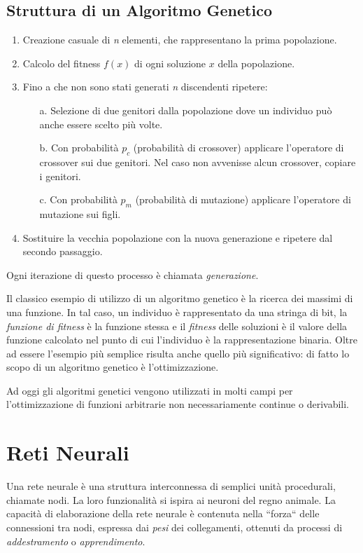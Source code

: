 \documentclass[12pt,a4paper]{report}
\begin{document}
\subsection{Struttura di un Algoritmo Genetico}

\begin{enumerate}
 \item Creazione casuale di \textit{n} elementi, che rappresentano la prima popolazione. 
 \item Calcolo del fitness $f(x)$ di ogni soluzione $x$ della popolazione.
 \item Fino a che non sono stati generati \textit{n} discendenti ripetere:
 \begin{enumerate}
  \item[a.] Selezione di due genitori dalla popolazione dove un individuo può anche essere scelto più volte.
  \item[b.] Con probabilità $p_{c}$ (probabilità di crossover) applicare l'operatore di crossover sui due genitori. Nel caso non avvenisse alcun crossover, copiare i genitori.
  \item[c.] Con probabilità $p_{m}$ (probabilità di mutazione) applicare l'operatore di mutazione sui figli.
 \end{enumerate}
 \item Sostituire la vecchia popolazione con la nuova generazione e ripetere dal secondo passaggio.
\end{enumerate}

Ogni iterazione di questo processo è chiamata \textit{generazione}.

Il classico esempio di utilizzo di un algoritmo genetico è la ricerca dei massimi di una funzione.
In tal caso, un individuo è rappresentato da una stringa di bit, la \textit{funzione di fitness} è la funzione stessa e il \textit{fitness} delle soluzioni è il valore della funzione calcolato nel punto di cui l'individuo è la rappresentazione binaria.
Oltre ad essere l'esempio più semplice risulta anche quello più significativo: di fatto lo scopo di un algoritmo genetico è l'ottimizzazione.  

Ad oggi gli algoritmi genetici vengono utilizzati in molti campi per l'ottimizzazione di funzioni arbitrarie non necessariamente continue o derivabili.

\section{Reti Neurali}

Una rete neurale è una struttura interconnessa di semplici unità procedurali, chiamate nodi. La loro funzionalità si ispira ai neuroni del regno animale. La capacità di elaborazione della rete neurale è contenuta nella ``forza`` delle connessioni tra nodi, espressa dai \textit{pesi} dei collegamenti, ottenuti da processi di \textit{ addestramento} o \textit{apprendimento}. \cite{neural-net-gurney}
\end{document}
